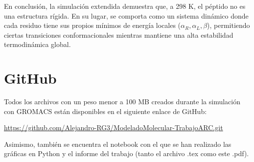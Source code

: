 \documentclass[12pt,a4paper]{article}
\begin{document}
En conclusión, la simulación extendida demuestra que, a 298 K, el péptido no es una estructura rígida. En su lugar, se comporta como un sistema dinámico donde cada residuo tiene sus propios mínimos de energía locales ($\alpha_R, \alpha_L, \beta$), permitiendo ciertas transiciones conformacionales mientras mantiene una alta estabilidad termodinámica global.

\section{GitHub}
Todos los archivos con un peso menor a 100 MB creados durante la simulación con GROMACS están disponibles en el siguiente enlace de GitHub:

\url{https://github.com/Alejandro-RG3/ModeladoMolecular-TrabajoARC.git}

Asimismo, también se encuentra el notebook con el que se han realizado las gráficas en Python y el informe del trabajo (tanto el archivo .tex como este .pdf).
\end{document}
